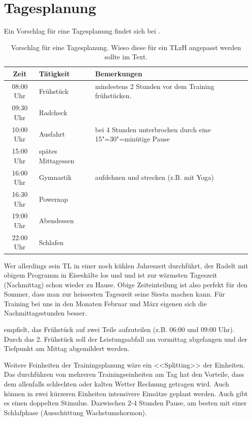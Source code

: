 \documentclass[a4paper,DIV13,BCOR0cm,draft=TRUE]{scrartcl}
\newcommand{\tlzh}{TLzH}
\begin{document}
 

\section{Tagesplanung}

Ein Vorschlag für eine Tagesplanung findet sich bei .

\begin{table}
  \centering
  \begin{tabular}{cll}
    \toprule
    Zeit & Tätigkeit & Bemerkungen \\
    \midrule
 08:00 Uhr & Frühstück & mindestens 2 Stunden vor dem Training frühstücken.\\
  09:30 Uhr & Radcheck & \\
  10:00 Uhr & Ausfahrt & bei 4 Stunden unterbrochen durch eine 15"=30"=minütige Pause \\
  15:00 Uhr & spätes Mittagessen & \\
  16:00 Uhr & Gymnastik & aufdehnen und strecken (z.B. mit Yoga) \\
  16:30 Uhr & Powernap & \\
  19:00 Uhr & Abendessen & \\
  22:00 Uhr & Schlafen & \\
    \bottomrule
  \end{tabular}
  \caption{Vorschlag für eine Tagesplanung. Wieso diese für ein \tlzh{} angepasst werden sollte im Text. }
  \label{tab:tagesplanboehme}
\end{table}


Wer allerdings sein TL in einer noch kühlen Jahreszeit durchführt, der Radelt mit obigem Programm
in Eiseskälte los und und ist zur wärmsten Tageszeit (Nachmittag) schon wieder zu Hause.
Obige Zeiteinteilung ist also perfekt für den Sommer, dass man zur heissesten Tageszeit seine Siesta machen kann.
Für Training bei uns in den Monaten Februar und März eigenen sich die Nachmittagsstunden besser.

 empfielt, das Frühstück auf zwei
Teile aufzuteilen (z.B. 06:00 und 09:00 Uhr). Durch das 2. Frühstück
soll der Leistungsabfall am vormittag abgefangen und der Tiefpunkt am Mittag
abgemildert werden.

Weitere Feinheiten der Trainingsplanung wäre ein <<Splitting>> der Einheiten.
Das durchführen von mehreren Trainingseinheiten am Tag hat den Vorteile,
dass dem allenfalls schlechten oder kalten Wetter Rechnung getragen wird.
Auch können in zwei kürzeren Einheiten intensivere Einsätze geplant werden.
Auch gibt es einen doppelten Stimulus.
Dazwischen 2-4 Stunden Pause, am besten mit einer Schlafphase (Ausschüttung Wachstumshormon).
\end{document}
